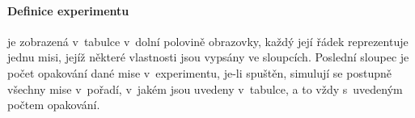         \paragraph{ Definice experimentu} je zobrazená v~tabulce v~dolní polovině obrazovky, každý její řádek reprezentuje jednu misi, jejíž některé vlastnosti jsou vypsány ve sloupcích. Poslední sloupec je počet opakování dané mise v~experimentu, je-li spuštěn, simulují se postupně všechny mise v~pořadí, v~jakém jsou uvedeny v~tabulce, a to vždy s~uvedeným počtem opakování.